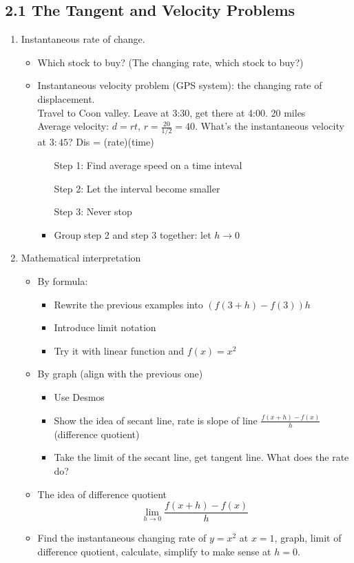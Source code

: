 \documentclass{article}
\begin{document}
\subsection{2.1 The Tangent and Velocity Problems}
\begin{enumerate}

\item Instantaneous rate of change.
\begin{itemize}
\item Which stock to buy? (The changing rate, which stock to buy?)
\item Instantaneous velocity problem (GPS system): the changing rate of displacement. \\
Travel to Coon valley. Leave at 3:30, get there at 4:00. 20 miles \\
Average velocity: $d=rt$, $r = \frac{20}{1/2} = 40$.
What's the instantaneous velocity at $3:45$? Dis = (rate)(time)
\begin{itemize}
\item [Step 1:] Find average speed on a time inteval
\item [Step 2:] Let the interval become smaller
\item [Step 3:] Never stop
\item Group step 2 and step 3 together: let $h\rightarrow 0$
\end{itemize}
\end{itemize}
\item Mathematical interpretation
\begin{itemize}
\item By formula:
\begin{itemize}
\item Rewrite the previous examples into $(f(3+h)-f(3))h$
\item Introduce limit notation
\item Try it with linear function and  $f(x) = x^2$
\end{itemize}
\item By graph (align with the previous one)
\begin{itemize}
\item Use Desmos
\item Show the idea of secant line, rate is slope of line $\frac{f(x+h)-f(x)}{h}$ (difference quotient)
\item Take the limit of the secant line, get tangent line. What does the rate do?
\end{itemize}
\item The idea of  difference quotient
$$
\lim_{h\rightarrow 0} \frac{f(x+h)-f(x)}{h}
$$
\item Find the instantaneous changing rate of $y  =x^2$ at $x=1$, graph, limit of difference quotient, calculate, simplify to make sense at $h=0$.
\end{itemize}


\end{enumerate}
\end{document}
